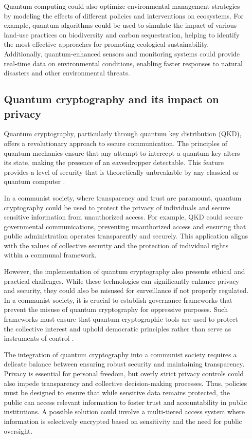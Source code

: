 Quantum computing could also optimize environmental management strategies by modeling the effects of different policies and interventions on ecosystems. For example, quantum algorithms could be used to simulate the impact of various land-use practices on biodiversity and carbon sequestration, helping to identify the most effective approaches for promoting ecological sustainability. Additionally, quantum-enhanced sensors and monitoring systems could provide real-time data on environmental conditions, enabling faster responses to natural disasters and other environmental threats.

\subsection{Quantum cryptography and its impact on privacy}

Quantum cryptography, particularly through quantum key distribution (QKD), offers a revolutionary approach to secure communication. The principles of quantum mechanics ensure that any attempt to intercept a quantum key alters its state, making the presence of an eavesdropper detectable. This feature provides a level of security that is theoretically unbreakable by any classical or quantum computer \cite[pp.~145-195]{Gisin2002}.

In a communist society, where transparency and trust are paramount, quantum cryptography could be used to protect the privacy of individuals and secure sensitive information from unauthorized access. For example, QKD could secure governmental communications, preventing unauthorized access and ensuring that public administration operates transparently and securely. This application aligns with the values of collective security and the protection of individual rights within a communal framework.

However, the implementation of quantum cryptography also presents ethical and practical challenges. While these technologies can significantly enhance privacy and security, they could also be misused for surveillance if not properly regulated. In a communist society, it is crucial to establish governance frameworks that prevent the misuse of quantum cryptography for oppressive purposes. Such frameworks must ensure that quantum cryptographic tools are used to protect the collective interest and uphold democratic principles rather than serve as instruments of control \cite[pp.~175-179]{Bennett1984}.

The integration of quantum cryptography into a communist society requires a delicate balance between ensuring robust security and maintaining transparency. Privacy is essential for personal freedom, but overly strict privacy controls could also impede transparency and collective decision-making processes. Thus, policies must be designed to ensure that while sensitive data remains protected, the public can access relevant information to foster trust and accountability in public institutions. A possible solution could involve a multi-tiered access system where information is selectively encrypted based on sensitivity and the need for public oversight.

